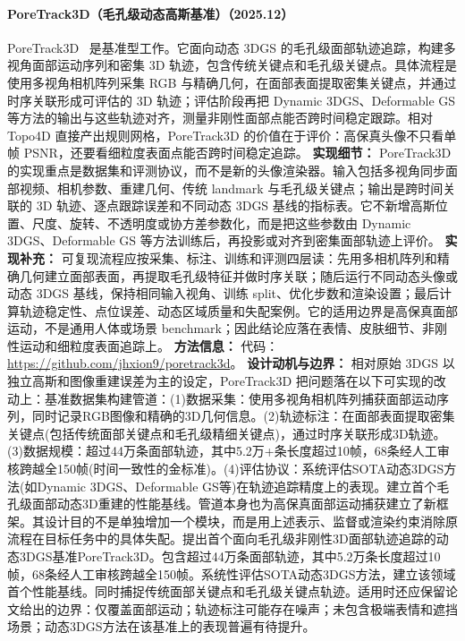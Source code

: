 \paragraph{PoreTrack3D（毛孔级动态高斯基准）（2025.12）}
PoreTrack3D~\cite{2512_02648} 是基准型工作。它面向动态 3DGS 的毛孔级面部轨迹追踪，构建多视角面部运动序列和密集 3D 轨迹，包含传统关键点和毛孔级关键点。具体流程是使用多视角相机阵列采集 RGB 与精确几何，在面部表面提取密集关键点，并通过时序关联形成可评估的 3D 轨迹；评估阶段再把 Dynamic 3DGS、Deformable GS 等方法的输出与这些轨迹对齐，测量非刚性面部点能否跨时间稳定跟踪。相对 Topo4D 直接产出规则网格，PoreTrack3D 的价值在于评价：高保真头像不只看单帧 PSNR，还要看细粒度表面点能否跨时间稳定追踪。
\textbf{实现细节：} PoreTrack3D 的实现重点是数据集和评测协议，而不是新的头像渲染器。输入包括多视角同步面部视频、相机参数、重建几何、传统 landmark 与毛孔级关键点；输出是跨时间关联的 3D 轨迹、逐点跟踪误差和不同动态 3DGS 基线的指标表。它不新增高斯位置、尺度、旋转、不透明度或协方差参数化，而是把这些参数由 Dynamic 3DGS、Deformable GS 等方法训练后，再投影或对齐到密集面部轨迹上评价。
\textbf{实现补充：} 可复现流程应按采集、标注、训练和评测四层读：先用多相机阵列和精确几何建立面部表面，再提取毛孔级特征并做时序关联；随后运行不同动态头像或动态 3DGS 基线，保持相同输入视角、训练 split、优化步数和渲染设置；最后计算轨迹稳定性、点位误差、动态区域质量和失配案例。它的适用边界是高保真面部运动，不是通用人体或场景 benchmark；因此结论应落在表情、皮肤细节、非刚性运动和细粒度表面追踪上。
\textbf{方法信息：} 代码：\url{https://github.com/jhxion9/poretrack3d}。
\textbf{设计动机与边界：} 相对原始 3DGS 以独立高斯和图像重建误差为主的设定，PoreTrack3D 把问题落在以下可实现的改动上：基准数据集构建管道：(1)数据采集：使用多视角相机阵列捕获面部运动序列，同时记录RGB图像和精确的3D几何信息。(2)轨迹标注：在面部表面提取密集关键点(包括传统面部关键点和毛孔级精细关键点)，通过时序关联形成3D轨迹。(3)数据规模：超过44万条面部轨迹，其中5.2万+条长度超过10帧，68条经人工审核跨越全150帧(时间一致性的金标准)。(4)评估协议：系统评估SOTA动态3DGS方法(如Dynamic 3DGS、Deformable GS等)在轨迹追踪精度上的表现。建立首个毛孔级面部动态3D重建的性能基线。管道本身也为高保真面部运动捕获建立了新框架。其设计目的不是单独增加一个模块，而是用上述表示、监督或渲染约束消除原流程在目标任务中的具体失配。提出首个面向毛孔级非刚性3D面部轨迹追踪的动态3DGS基准PoreTrack3D。包含超过44万条面部轨迹，其中5.2万条长度超过10帧，68条经人工审核跨越全150帧。系统性评估SOTA动态3DGS方法，建立该领域首个性能基线。同时捕捉传统面部关键点和毛孔级关键点轨迹。适用时还应保留论文给出的边界：仅覆盖面部运动；轨迹标注可能存在噪声；未包含极端表情和遮挡场景；动态3DGS方法在该基准上的表现普遍有待提升。
